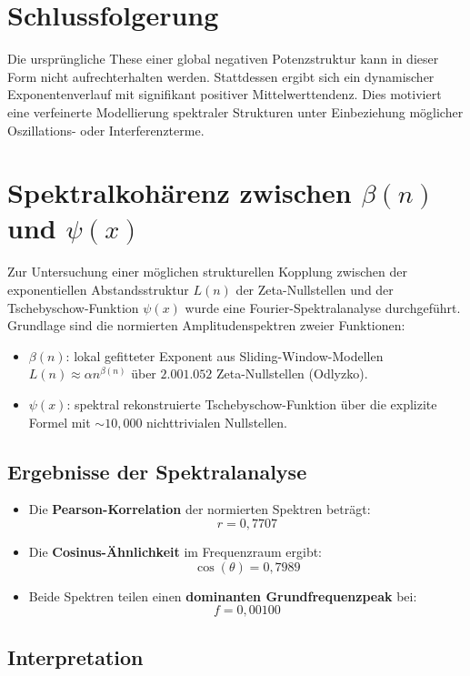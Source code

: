 \documentclass[12pt]{article}
\begin{document}
\section{Schlussfolgerung}
Die ursprüngliche These einer global negativen Potenzstruktur kann in dieser Form nicht aufrechterhalten werden. Stattdessen ergibt sich ein dynamischer Exponentenverlauf mit signifikant positiver Mittelwerttendenz. Dies motiviert eine verfeinerte Modellierung spektraler Strukturen unter Einbeziehung möglicher Oszillations- oder Interferenzterme.

\section{Spektralkohärenz zwischen \texorpdfstring{$\beta(n)$}{beta(n)} und \texorpdfstring{$\psi(x)$}{psi(x)}}

Zur Untersuchung einer möglichen strukturellen Kopplung zwischen der exponentiellen Abstandsstruktur $L(n)$ der Zeta-Nullstellen und der Tschebyschow-Funktion $\psi(x)$ wurde eine Fourier-Spektralanalyse durchgeführt. Grundlage sind die normierten Amplitudenspektren zweier Funktionen:

\begin{itemize}
  \item $\beta(n)$: lokal gefitteter Exponent aus Sliding-Window-Modellen $L(n) \approx \alpha n^{\beta(n)}$ über $2{.}001{.}052$ Zeta-Nullstellen (Odlyzko).
  \item $\psi(x)$: spektral rekonstruierte Tschebyschow-Funktion über die explizite Formel mit $\sim 10{,}000$ nichttrivialen Nullstellen.
\end{itemize}

\subsection*{Ergebnisse der Spektralanalyse}

\begin{itemize}
  \item Die \textbf{Pearson-Korrelation} der normierten Spektren beträgt:
  \[
  r = 0{,}7707
  \]
  \item Die \textbf{Cosinus-Ähnlichkeit} im Frequenzraum ergibt:
  \[
  \cos(\theta) = 0{,}7989
  \]
  \item Beide Spektren teilen einen \textbf{dominanten Grundfrequenzpeak} bei:
  \[
  f = 0{,}00100
  \]
\end{itemize}

\subsection*{Interpretation}
\end{document}
